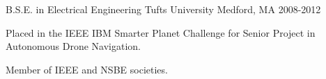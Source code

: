 

\begin{cventries}

  \cventry
    {B.S.E. in Electrical Engineering} %
    {Tufts University} %
    {Medford, MA} %
    {2008-2012} %
    {
      \begin{cvitems} %
        \item {Placed in the IEEE IBM Smarter Planet Challenge for Senior Project in Autonomous Drone Navigation.}
        \item {Member of IEEE and NSBE societies.}
      \end{cvitems}
    }

\end{cventries}
